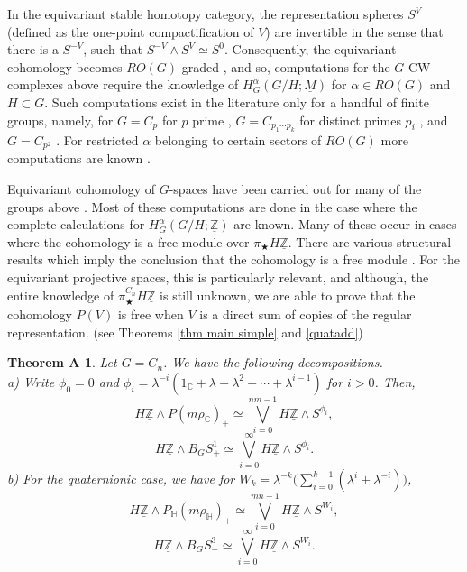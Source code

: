 \documentclass[a4paper,leqno,11pt]{amsart}
\theoremstyle{plain}
\newtheorem*{thma}{Theorem A}
\theoremstyle{definition}
\theoremstyle{remark}
\theoremstyle{definition}
\newcommand{\C}{{\mathbb C}}
\newcommand{\Hyp}{{\mathbb H}}
\newcommand{\uM}{\underline{M}}
\newcommand{\uZ}{\underline{\mathbb{Z}}}
\def\lam{\lambda}
\def\C{\mathbb{C}}
\numberwithin{equation}{section}
\newcommand{\smas}{\wedge}
\begin{document}
	In the equivariant stable homotopy category, the representation spheres $S^V$ (defined as the one-point compactification of $V$) are invertible in the sense that there is a $S^{-V}$, such that $S^{-V} \wedge S^V \simeq S^0$. Consequently, the equivariant cohomology becomes $RO(G)$-graded \cite[Ch. XIII]{May-EquivBook}, and so, computations for the $G$-CW complexes above require the knowledge of $H^\alpha_G(G/H;\uM)$ for $\alpha \in RO(G)$ and $H\subset G$. Such computations exist in the literature only for a handful of finite groups, namely, for $G=C_p$ for $p$ prime \cite{Lewis}, $G=C_{p_1\cdots p_k}$ for distinct primes $p_i$ \cite{BG19,BG20}, and $G=C_{p^2}$ \cite{Zeng}. For restricted $\alpha$ belonging to certain sectors of $RO(G)$ more computations are known \cite{HHR, HHR-slicess,HoKr17, BasuDey}.   
	
	Equivariant cohomology of $G$-spaces have been carried out for many of the groups above \cite{Haz21, Hog21, BasuDeyKarmakar-NYJM}. Most of these computations are done in the case where the complete calculations for  $H^\alpha_G(G/H;\uZ)$ are known. Many of these occur in cases where the cohomology is a free module over $\pi_\bigstar H\uZ$. There are various structural results which imply the conclusion that the cohomology is a free module \cite{May20,BasuGhosh-cp}. For the equivariant projective spaces, this is  particularly relevant, and although, the entire knowledge of $\pi_\bigstar^{C_n}H\uZ$ is still unknown, we are able to prove that the cohomology $P(V)$ is free when $V$ is a direct sum of copies of the regular representation. (see Theorems \ref{thm main simple} and \ref{quatadd})
	\begin{thma} Let $G=C_n$. We have the following decompositions. \\
a) Write $\phi_{0}= 0$ and $\phi_{i} = \lam^{-i}(1_\C+\lam + \lam^2 +\cdots + \lam^{i-1})$ for $i> 0$. Then, 		
$$H\uZ\smas P(m\rho_\C)_+ \simeq \bigvee_{i=0}^{nm-1}H\uZ\smas S^{\phi_{i}},$$ 
		$$H\uZ\smas B_GS^1_+ \simeq \bigvee_{i=0}^{\infty}H\uZ\smas S^{\phi_{i}}.$$
b) For the quaternionic case, we have for $W_k = \lambda^{-k}\Big(\sum_{i=0}^{k-1}(\lambda^i + \lambda^{-i})\Big)$,
$$H\uZ \smas P_{\mathbb H}(m\rho_\Hyp)_+ \simeq \bigvee_{i=0}^{mn-1}H\uZ\smas S^{W_i},$$ 
		$$H\uZ\smas B_GS^3_+ \simeq \bigvee_{i=0}^{\infty}H\uZ\smas S^{W_{i}}.$$
	\end{thma} 
\end{document}
